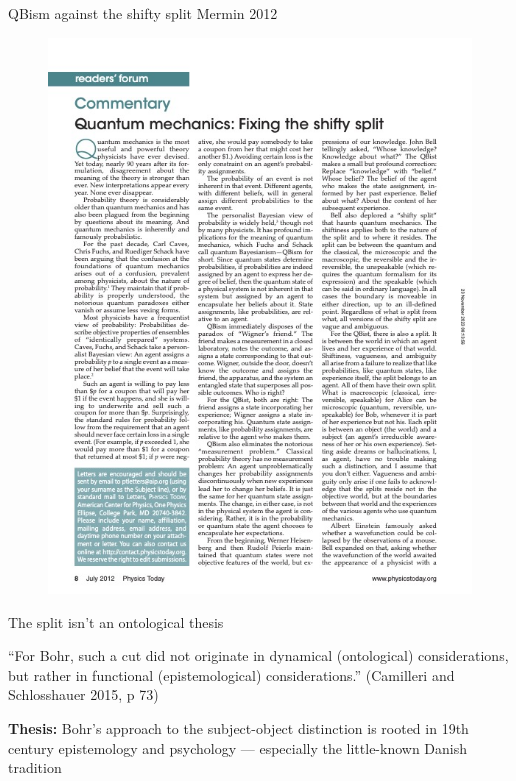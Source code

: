 \documentclass[ignorenonframetext, ]{beamer}
\begin{document}
\begin{frame}{QBism against the shifty split \newline Mermin 2012}

  \begin{figure}
    \centering \includegraphics[scale=0.5]{mermin.jpg}
  \end{figure}  

\end{frame}

  
\begin{frame}{The split isn't an ontological thesis}

  ``For Bohr, such a cut did not originate in dynamical (ontological)
  considerations, but rather in functional (epistemological)
  considerations.'' (Camilleri and Schlosshauer 2015, p 73)

  \vfill \textbf{Thesis:} Bohr's approach to the subject-object
  distinction is rooted in 19th century epistemology and psychology
  --- especially the little-known Danish tradition
    
\end{frame}
\end{document}
